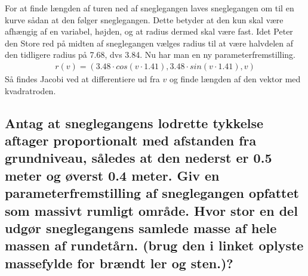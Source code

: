 For at finde længden af turen ned af sneglegangen laves sneglegangen om til en kurve sådan at den følger sneglegangen. Dette betyder at den kun skal være afhængig af en variabel, højden, og at radius dermed skal være fast. Idet Peter den Store red på midten af sneglegangen vælges radius til at være halvdelen af den tidligere radius på 7.68, dvs 3.84.
Nu har man en ny parameterfremstilling.
\begin{align}
    r(v) = (3.48 \cdot cos(v \cdot 1.41), 3.48 \cdot sin(v\cdot 1.41), v)
\end{align}
Så findes Jacobi ved at differentiere ud fra $v$ og finde længden af den vektor med kvadratroden. 

\subsection{Antag at sneglegangens lodrette tykkelse aftager proportionalt med afstanden fra grundniveau, således at den nederst er 0.5 meter og øverst 0.4 meter. Giv en parameterfremstilling af sneglegangen opfattet som massivt rumligt område. Hvor stor en del udgør sneglegangens samlede masse af hele massen af rundetårn. (brug den i linket oplyste massefylde for brændt ler og sten.)?}